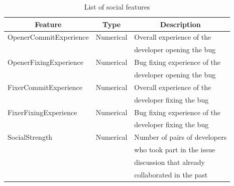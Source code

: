\documentclass[sigconf,review]{acmart}
\begin{document}
\begin{table}[h]
\caption{List of social features} \label{tabel:social}
\begin{tabular}{lll}
\hline
\hline
\multicolumn{1}{c}{Feature}
& \multicolumn{1}{c}{Type}
&	\multicolumn{1}{c}{Description}    \\    

\hline
   OpenerCommitExperience & Numerical & Overall experience of the \\&& developer opening the bug \\     
   OpenerFixingExperience & Numerical & Bug fixing experience of the \\&& developer opening the bug \\
   FixerCommitExperience & Numerical & Overall experience of the \\&& developer fixing the bug\\
   FixerFixingExperience & Numerical & Bug fixing experience of the \\&& developer fixing the bug\\
   SocialStrength 		 & Numerical & Number of pairs of developers \\&&who took part in the issue \\&&discussion that already \\&&collaborated in the past\\


\hline
\hline
\end{tabular}
\end{table}
\end{document}
